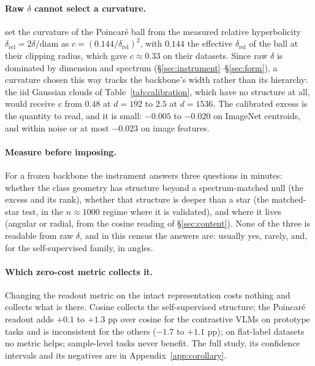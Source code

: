 \documentclass{article}
\begin{document}
\paragraph{Raw $\delta$ cannot select a curvature.} \citet{Khrulkov_2020_CVPR} set the curvature of the Poincar\'{e} ball from the measured relative hyperbolicity $\delta_{\text{rel}}=2\delta/\mathrm{diam}$ as $c=(0.144/\delta_{\text{rel}})^2$, with $0.144$ the effective $\delta_{\text{rel}}$ of the ball at their clipping radius, which gave $c\approx0.33$ on their datasets. Since raw $\delta$ is dominated by dimension and spectrum (\S\ref{sec:instrument}--\S\ref{sec:form}), a curvature chosen this way tracks the backbone's width rather than its hierarchy: the iid Gaussian clouds of Table~\ref{tab:calibration}, which have no structure at all, would receive $c$ from $0.48$ at $d{=}192$ to $2.5$ at $d{=}1536$. The calibrated excess is the quantity to read, and it is small: $-0.005$ to $-0.020$ on ImageNet centroids, and within noise or at most $-0.023$ on image features. %

\paragraph{Measure before imposing.} For a frozen backbone the instrument answers three questions in minutes: whether the class geometry has structure beyond a spectrum-matched null (the excess and its rank), whether that structure is deeper than a star (the matched-star test, in the $n\approx1000$ regime where it is validated), and where it lives (angular or radial, from the cosine reading of \S\ref{sec:content}). None of the three is readable from raw $\delta$, and in this census the answers are: usually yes, rarely, and, for the self-supervised family, in angles.

\paragraph{Which zero-cost metric collects it.} Changing the readout metric on the intact representation costs nothing and collects what is there. Cosine collects the self-supervised structure; the Poincar\'{e} readout adds $+0.1$ to $+1.3$ pp over cosine for the contrastive VLMs on prototype tasks and is inconsistent for the others ($-1.7$ to $+1.1$ pp); on flat-label datasets no metric helps; sample-level tasks never benefit. The full study, its confidence intervals and its negatives are in Appendix~\ref{app:corollary}. %
\end{document}
